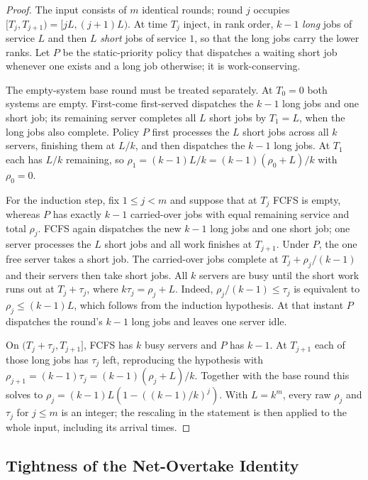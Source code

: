 \documentclass[mathematics,supfile,submit,moreauthors]{Definitions/mdpi}
\begin{document}
\begin{proof}
The input consists of $m$ identical rounds; round $j$ occupies
$[T_j, T_{j+1}) = [jL, (j+1)L)$. At time $T_j$ inject, in rank order, $k-1$
\emph{long} jobs of service $L$ and then $L$ \emph{short} jobs of service $1$, so
that the long jobs carry the lower ranks. Let $P$ be the static-priority policy
that dispatches a waiting short job whenever one exists and a long job
otherwise; it is work-conserving.

The empty-system base round must be treated separately. At $T_0=0$ both systems
are empty. First-come first-served dispatches the $k-1$ long jobs and one short
job; its remaining server completes all $L$ short jobs by $T_1=L$, when the long
jobs also complete. Policy $P$ first processes the $L$ short jobs across all
$k$ servers, finishing them at $L/k$, and then dispatches the $k-1$ long jobs.
At $T_1$ each has $L/k$ remaining, so
$\rho_1=(k-1)L/k=(k-1)(\rho_0+L)/k$ with $\rho_0=0$.

For the induction step, fix $1\le j<m$ and suppose that at $T_j$ FCFS is empty,
whereas $P$ has exactly $k-1$ carried-over jobs with equal remaining service and
total $\rho_j$. FCFS again dispatches the new $k-1$ long jobs and one short job;
one server processes the $L$ short jobs and all work finishes at $T_{j+1}$.
Under $P$, the one free server takes a short job. The carried-over jobs complete
at $T_j+\rho_j/(k-1)$ and their servers then take short jobs. All $k$ servers are
busy until the short work runs out at $T_j+\tau_j$, where
$k\tau_j=\rho_j+L$. Indeed, $\rho_j/(k-1)\leq\tau_j$ is equivalent to
$\rho_j\leq(k-1)L$, which follows from the induction hypothesis. At that instant
$P$ dispatches the round's $k-1$ long jobs and leaves one server idle.

On $(T_j+\tau_j,T_{j+1}]$, FCFS has $k$ busy servers and $P$ has $k-1$.
At $T_{j+1}$ each of those long jobs has $\tau_j$ left, reproducing the
hypothesis with
$\rho_{j+1}=(k-1)\tau_j=(k-1)(\rho_j+L)/k$. Together with the base round this
solves to $\rho_j=(k-1)L(1-((k-1)/k)^j)$. With $L=k^m$, every raw $\rho_j$ and
$\tau_j$ for $j\leq m$ is an integer; the rescaling in the statement is then
applied to the whole input, including its arrival times.
\end{proof}

\subsection{Tightness of the Net-Overtake Identity}
\label{sec:supp_tight1}
\end{document}
